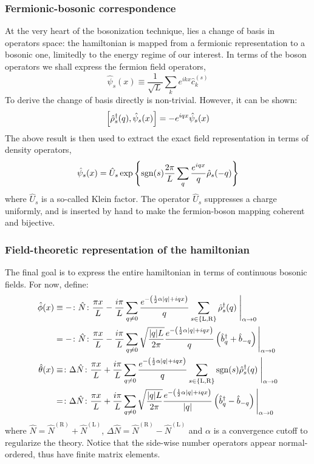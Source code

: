 \subsubsection*{Fermionic-bosonic correspondence}
At the very heart of the bosonization technique, lies a change of basis in operators space: the hamiltonian is mapped from a fermionic representation to a bosonic one, limitedly to the energy regime of our interest. In terms of the boson operators we shall express the fermion field operators,
\[
	\hat \psi_s (x) \equiv \frac{1}{\sqrt{L}} \sum_k e^{ikx} \hat c_k^{(s)}
\]
To derive the change of basis directly is non-trivial. However, it can be shown:
\[
	\comm{\hat \rho_s^\dagger (q)}{\hat \psi_s (x)} = -e^{iqx} \hat \psi_s (x)
\]
The above result is then used to extract the exact field representation in terms of density operators,
\[
	\hat \psi_s (x) = \hat U_s \exp\left\{ \mathrm{sgn}(s) \frac{2\pi}{L} \sum_q \frac{e^{iqx}}{q} \hat \rho_s (-q) \right\}
\]
where $\hat U_s$ is a so-called Klein factor. The operator $\hat U_s$ suppresses a charge uniformly, and is inserted by hand to make the fermion-boson mapping coherent and bijective.

\subsubsection*{Field-theoretic representation of the hamiltonian}

The final goal is to express the entire hamiltonian in terms of continuous bosonic fields. For now, define:
\[
\begin{aligned}
	\hat \phi(x) &\equiv - \colon \hat N \colon \frac{\pi x}{L} - \frac{i\pi}{L} \sum_{q \neq 0} \frac{e^{-\left( \frac{1}{2} \alpha \abs{q} + iqx \right)}}{q} \sum_{s \in \left\{\mathrm L, \mathrm R\right\}} \hat \rho_s^\dagger (q) \;\Bigg|_{\alpha \to 0} \\
	&= - \colon \hat N \colon \frac{\pi x}{L} - \frac{i\pi}{L} \sum_{q \neq 0} \sqrt{\frac{\abs{q} L}{2\pi}} \frac{e^{-\left( \frac{1}{2} \alpha \abs{q} + iqx \right)}}{q} \left( \hat b_q^\dagger + \hat b_{-q} \right)\Bigg|_{\alpha \to 0} \\
	\hat \theta(x) &\equiv \colon \Delta \hat N \colon \frac{\pi x}{L} + \frac{i\pi}{L} \sum_{q \neq 0} \frac{e^{-\left( \frac{1}{2} \alpha \abs{q} + iqx \right)}}{q} \sum_{s \in \left\{\mathrm L, \mathrm R\right\}} \mathrm{sgn}(s) \hat \rho_s^\dagger (q) \;\Bigg|_{\alpha \to 0} \\
	&= \colon \Delta \hat N \colon \frac{\pi x}{L} + \frac{i\pi}{L} \sum_{q \neq 0} \sqrt{\frac{\abs{q} L}{2\pi}} \frac{e^{-\left( \frac{1}{2} \alpha \abs{q} + iqx \right)}}{\abs{q}} \left( \hat b_q^\dagger - \hat b_{-q} \right)\Bigg|_{\alpha \to 0} \\
\end{aligned}
\]
where $\hat N = \hat N^{(\mathrm R)} + \hat N^{(\mathrm L)}$, $\Delta \hat N = \hat N^{(\mathrm R)} - \hat N^{(\mathrm L)}$ and $\alpha$ is a convergence cutoff to regularize the theory. Notice that the side-wise number operators appear normal-ordered, thus have finite matrix elements.

